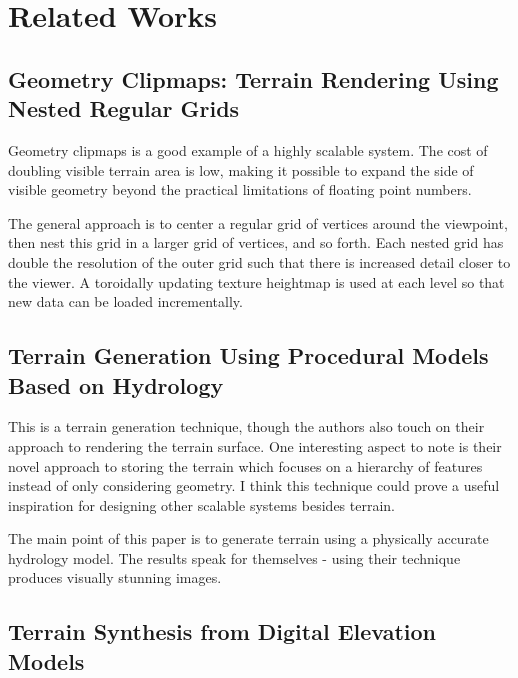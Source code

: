 
\chapter{Related Works}

\section{Geometry Clipmaps: Terrain Rendering Using Nested Regular Grids}

Geometry clipmaps is a good example of a highly scalable system.
The cost of doubling visible terrain area is low, making it possible to expand the side of visible geometry beyond the practical limitations of floating point numbers. \cite{geometry_clipmaps}

The general approach is to center a regular grid of vertices around the viewpoint, then nest this grid in a larger grid of vertices, and so forth.
Each nested grid has double the resolution of the outer grid such that there is increased detail closer to the viewer.
A toroidally updating texture heightmap is used at each level so that new data can be loaded incrementally.


\section{Terrain Generation Using Procedural Models Based on Hydrology}

This is a terrain generation technique, though the authors also touch on their approach to rendering the terrain surface.
One interesting aspect to note is their novel approach to storing the terrain which focuses on a hierarchy of features instead of only considering geometry.
I think this technique could prove a useful inspiration for designing other scalable systems besides terrain.

The main point of this paper is to generate terrain using a physically accurate hydrology model.
The results speak for themselves - using their technique produces visually stunning images.


\section{Terrain Synthesis from Digital Elevation Models}

